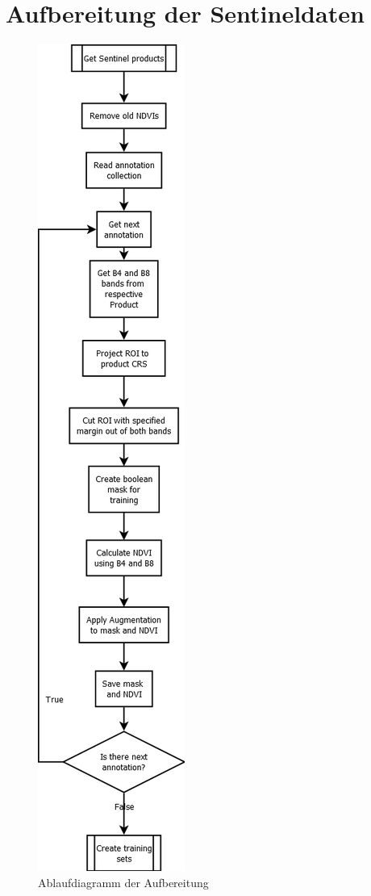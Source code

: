\section{Aufbereitung der Sentineldaten}

\begin{figure}[H]
  \centering
  \includegraphics[height=0.75\textheight]{pics/create-ndvi.png}
  \caption{Ablaufdiagramm der Aufbereitung}
  \label{fig:create-ndvi}
\end{figure}

